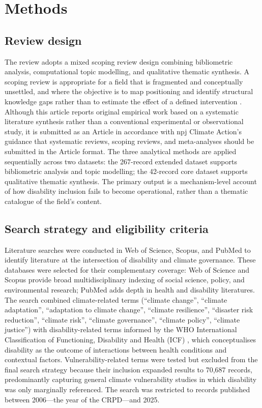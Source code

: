 \documentclass[12pt,a4paper]{article}
\begin{document}

\section*{Methods}

\subsection*{Review design}

The review adopts a mixed scoping review design combining bibliometric analysis, computational topic modelling, and qualitative thematic synthesis. A scoping review is appropriate for a field that is fragmented and conceptually unsettled, and where the objective is to map positioning and identify structural knowledge gaps rather than to estimate the effect of a defined intervention \cite{arksey2005scoping,levac2010scoping,munn2018systematic}. Although this article reports original empirical work based on a systematic literature synthesis rather than a conventional experimental or observational study, it is submitted as an Article in accordance with npj Climate Action's guidance that systematic reviews, scoping reviews, and meta-analyses should be submitted in the Article format. The three analytical methods are applied sequentially across two datasets: the 267-record extended dataset supports bibliometric analysis and topic modelling; the 42-record core dataset supports qualitative thematic synthesis. The primary output is a mechanism-level account of how disability inclusion fails to become operational, rather than a thematic catalogue of the field's content.

\subsection*{Search strategy and eligibility criteria}

Literature searches were conducted in Web of Science, Scopus, and PubMed to identify literature at the intersection of disability and climate governance. These databases were selected for their complementary coverage: Web of Science and Scopus provide broad multidisciplinary indexing of social science, policy, and environmental research; PubMed adds depth in health and disability literatures. The search combined climate-related terms (``climate change'', ``climate adaptation'', ``adaptation to climate change'', ``climate resilience'', ``disaster risk reduction'', ``climate risk'', ``climate governance'', ``climate policy'', ``climate justice'') with disability-related terms informed by the WHO International Classification of Functioning, Disability and Health (ICF) \cite{who_2001_icf}, which conceptualises disability as the outcome of interactions between health conditions and contextual factors. Vulnerability-related terms were tested but excluded from the final search strategy because their inclusion expanded results to 70,687 records, predominantly capturing general climate vulnerability studies in which disability was only marginally referenced. The search was restricted to records published between 2006---the year of the CRPD---and 2025.
\end{document}
